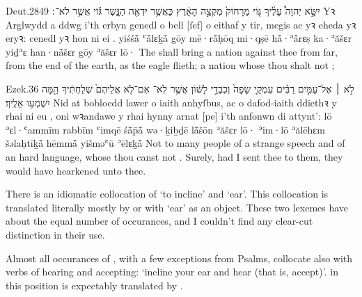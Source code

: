 \begin{example}{Deut.}{28}{49}{}{}
	\quoling
	{יִשָּׂ֣א יְהוָה֩ עָלֶ֨יךָ גּ֤וֹי מֵרָחוֹק֙ מִקְצֵ֣ה הָאָ֔רֶץ כַּאֲשֶׁ֥ר יִדְאֶ֖ה הַנָּ֑שֶׁר גּ֕וֹי אֲשֶׁ֥ר לֹא־ ׃}
	{Yꝛ Arglwydd a ddwg i’th erbyn genedl o bell [ſef] o eithaf y tir, megis ac yꝛ eheda yꝛ eryꝛ: cenedl yꝛ hon ni  ei .}
	{yiśśå̄ {\YHWH} ʿå̄lɛḵå̄ gōy mē·rå̄ḥōq mi·qṣē hå̄·ʾå̄rɛṣ ka·ʾăšɛr yiḏʾɛ han·nå̄šɛr gōy ʾăšɛr lō· }
	{The {\LORD} shall bring a nation against thee from far, from the end of the earth,  as the eagle flieth; a nation whose  thou shalt not ;}
\end{example}

\begin{example}{Ezek.}{3}{6}{}{}
	\quoling
	{לֹ֣א ׀ אֶל־עַמִּ֣ים רַבִּ֗ים עִמְקֵ֤י שָׂפָה֙ וְכִבְדֵ֣י לָשׁ֔וֹן אֲשֶׁ֥ר לֹֽא־  אִם־לֹ֤א אֲלֵיהֶם֙ שְׁלַחְתִּ֔יךָ הֵ֖מָּה יִשְׁמְע֥וּ אֵלֶֽיךָ׃}
	{Nid at bobloedd lawer o iaith anhyſbus, ac o dafod-iaith ddiethꝛ y rhai ni  eu , oni wꝛandawe y rhai hynny arnat [pe] i’th anfonwn di attynt’:}
	{lō ʾɛl·ʿammīm rabbīm ʿimqē śå̄p̄å̄ wə·ḵiḇḏē lå̄šōn ʾăšɛr lō·  ʾim·lō ʾălēhɛm šəlaḥtīḵå̄ hēmmå̄ yišməʿū ʾēlɛḵå̄}
	{Not to many people of a strange speech and of an hard language, whose  thou canst not . Surely, had I sent thee to them, they would have hearkened unto thee.}
\end{example}







\begin{paper}
	There is an idiomatic collocation of  ‘to incline’ and  ‘ear’. This collocation is translated literally mostly by or  with  ‘ear’ as an object. These two lexemes have about the equal number of occurances, and I couldn’t find any clear-cut distinction in their use.

	Almost all occurances of , with a few exceptions from Psalms, collocate also with verbs of hearing and accepting: ‘incline your ear and hear (that is, accept)’.  in this position is expectably translated by .
\end{paper}

